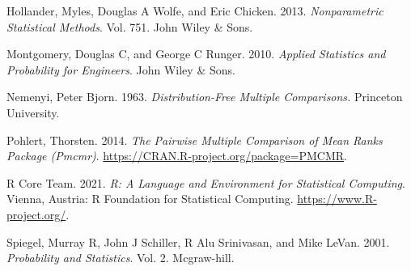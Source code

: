 \documentclass[]{article}
\begin{document}
\leavevmode\hypertarget{ref-hollander2013nonparametric}{}%
Hollander, Myles, Douglas A Wolfe, and Eric Chicken. 2013. \emph{Nonparametric Statistical Methods}. Vol. 751. John Wiley \& Sons.

\leavevmode\hypertarget{ref-montgomery2010applied}{}%
Montgomery, Douglas C, and George C Runger. 2010. \emph{Applied Statistics and Probability for Engineers}. John Wiley \& Sons.

\leavevmode\hypertarget{ref-nemenyi1963distribution}{}%
Nemenyi, Peter Bjorn. 1963. \emph{Distribution-Free Multiple Comparisons.} Princeton University.

\leavevmode\hypertarget{ref-PMCMR}{}%
Pohlert, Thorsten. 2014. \emph{The Pairwise Multiple Comparison of Mean Ranks Package (Pmcmr)}. \url{https://CRAN.R-project.org/package=PMCMR}.

\leavevmode\hypertarget{ref-Rlang}{}%
R Core Team. 2021. \emph{R: A Language and Environment for Statistical Computing}. Vienna, Austria: R Foundation for Statistical Computing. \url{https://www.R-project.org/}.

\leavevmode\hypertarget{ref-spiegel2001probability}{}%
Spiegel, Murray R, John J Schiller, R Alu Srinivasan, and Mike LeVan. 2001. \emph{Probability and Statistics}. Vol. 2. Mcgraw-hill.
\end{document}
